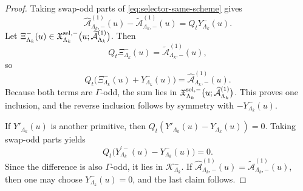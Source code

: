 \documentclass[11pt]{article}
\begin{document}
\begin{proof}
Taking swap-odd parts of \eqref{eq:selector-same-scheme} gives
\[
\widehat{\mathcal A}^{(1)}_{\Lambda_k,-}(u)
-
\widetilde{\mathcal A}^{(1)}_{\Lambda_k,-}(u)
=
Q_tY^-_{\Lambda_k}(u).
\]
Let
\(
\Xi^-_{\Lambda_k}(u)
\in
\mathfrak X_{\Lambda_k}^{{\rm sel},-}
\big(u;\widetilde{\mathcal A}^{(1)}_{\Lambda_k}\big)
\).
Then
\[
Q_t\Xi^-_{\Lambda_k}(u)
=
\widetilde{\mathcal A}^{(1)}_{\Lambda_k,-}(u),
\]
so
\[
Q_t\big(
\Xi^-_{\Lambda_k}(u)+Y^-_{\Lambda_k}(u)
\big)
=
\widehat{\mathcal A}^{(1)}_{\Lambda_k,-}(u).
\]
Because both terms are \(\Gamma\)-odd, the sum lies in
\(
\mathfrak X_{\Lambda_k}^{{\rm sel},-}
\big(u;\widehat{\mathcal A}^{(1)}_{\Lambda_k}\big)
\).
This proves one inclusion, and the reverse inclusion follows by symmetry with \(-Y^-_{\Lambda_k}(u)\).

If \(Y'_{\Lambda_k}(u)\) is another primitive, then
\(
Q_t(Y'_{\Lambda_k}(u)-Y_{\Lambda_k}(u))=0
\).
Taking swap-odd parts yields
\[
Q_t\big(
Y_{\Lambda_k}^{\prime -}(u)-Y^-_{\Lambda_k}(u)
\big)=0.
\]
Since the difference is also \(\Gamma\)-odd, it lies in \(\mathcal K^-_{\Lambda_k}\).
If
\(
\widehat{\mathcal A}^{(1)}_{\Lambda_k,-}(u)
=
\widetilde{\mathcal A}^{(1)}_{\Lambda_k,-}(u)
\),
then one may choose \(Y^-_{\Lambda_k}(u)=0\), and the last claim follows.
\end{proof}
\end{document}
